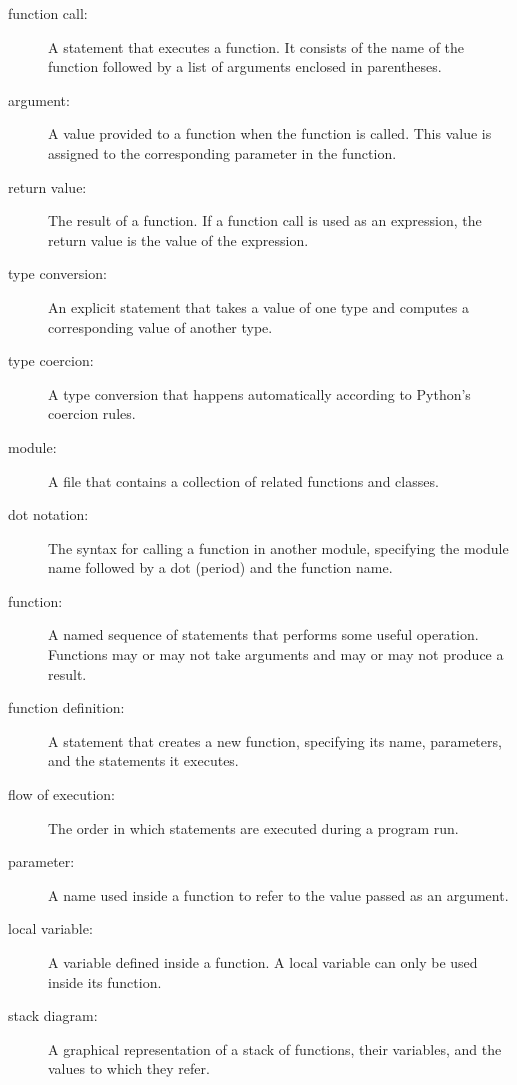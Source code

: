 \begin{description}

\item[function call:]  A statement that executes a function. It consists of
the name of the function followed by a list of arguments enclosed in
parentheses.

\item[argument:]  A value provided to a function when the function is called.
This value is assigned to the corresponding parameter in the function.

\item[return value:]  The result of a function.  If a function call
is used as an expression, the return value is the value of
the expression.

\item[type conversion:] An explicit statement that takes a value
of one type and computes a corresponding value of another type.

\item[type coercion:]  A type conversion that happens automatically
according to Python's coercion rules.

\item[module:]  A file that contains a collection of related functions and
classes.

\item[dot notation:]  The syntax for calling a function in another
module, specifying the module name followed by a dot (period) and
the function name.

\item[function:]  A named sequence of statements that performs some useful
operation.  Functions may or may not take arguments and may or may not
produce a result.

\item[function definition:]  A statement that creates a new function,
specifying its name, parameters, and the statements it executes.

\item[flow of execution:]  The order in which statements are executed during
a program run.

\item[parameter:]  A name used inside a function to refer to the value passed
as an argument.

\item[local variable:]  A variable defined inside a function.  A local
variable can only be used inside its function.

\item[stack diagram:]  A graphical representation of a stack of functions,
their variables, and the values to which they refer.


\end{description}
